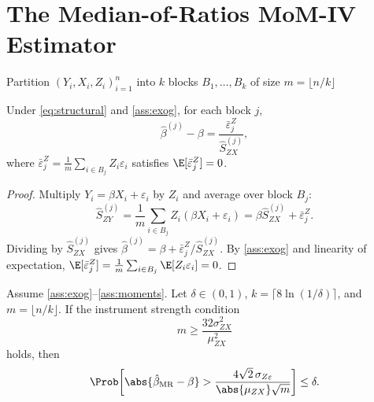 \section{The Median-of-Ratios MoM-IV Estimator}
\label{sec:mor}

\begin{algorithm}[H]
\label{alg:mor}
\caption{Median-of-Ratios Estimator}

Partition $(Y_i,X_i,Z_i)_{i=1}^{n}$ into $k$ blocks $B_1, \dots, B_k$ of size $m = \lfloor n/k \rfloor$\;


\;
\end{algorithm}

\begin{lemma}
\label{lem:mor_decomp}
Under \eqref{eq:structural} and \ref{ass:exog}, for each block $j$,
\begin{equation}
\label{eq:block_error}
    \hat{\beta}^{(j)} - \beta = \frac{\bar{\varepsilon}_j^Z}{\hat{S}_{ZX}^{(j)}},
\end{equation}
where $\bar{\varepsilon}_j^Z = \frac{1}{m}\sum_{i \in B_j}Z_i\varepsilon_i$ satisfies $\E[\bar{\varepsilon}_j^Z] = 0$.
\end{lemma}

\begin{proof}
Multiply $Y_i = \beta X_i + \varepsilon_i$ by $Z_i$ and average over block $B_j$:
\[
    \hat{S}_{ZY}^{(j)} = \frac{1}{m}\sum_{i \in B_j}Z_i(\beta X_i + \varepsilon_i) = \beta\hat{S}_{ZX}^{(j)} + \bar{\varepsilon}_j^Z.
\]
Dividing by $\hat{S}_{ZX}^{(j)}$ gives $\hat{\beta}^{(j)} = \beta + \bar{\varepsilon}_j^Z/\hat{S}_{ZX}^{(j)}$. By \ref{ass:exog} and linearity of expectation, $\E[\bar{\varepsilon}_j^Z] = \frac{1}{m}\sum_{i \in B_j}\E[Z_i\varepsilon_i] = 0$.
\end{proof}

\begin{theorem}
\label{thm:mor}
Assume \ref{ass:exog}--\ref{ass:moments}. Let $\delta \in (0,1)$, $k = \lceil 8\ln(1/\delta) \rceil$, and $m = \lfloor n/k \rfloor$. If the instrument strength condition
\begin{equation}
\label{eq:mor_strength}
    m \geq \frac{32\sigma_{ZX}^2}{\mu_{ZX}^2}
\end{equation}
holds, then
\begin{equation}
\label{eq:mor_bound}
    \Prob\!\left[\abs{\hat{\beta}_{\mathrm{MR}} - \beta} > \frac{4\sqrt{2}\,\sigma_{Z\varepsilon}}{\abs{\mu_{ZX}}\sqrt{m}}\right] \leq \delta.
\end{equation}
\end{theorem}


